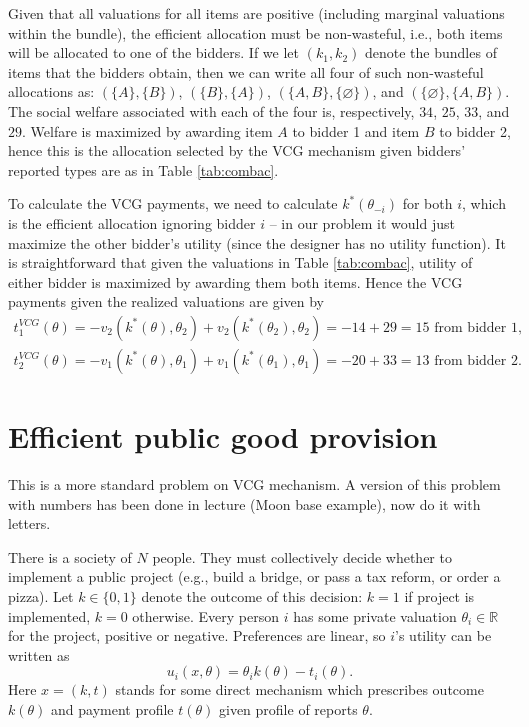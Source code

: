 \documentclass[a4paper]{article}
\begin{document}
	Given that all valuations for all items are positive (including marginal valuations within the bundle), the efficient allocation must be non-wasteful, i.e., both items will be allocated to one of the bidders. If we let $(k_1,k_2)$ denote the bundles of items that the bidders obtain, then we can write all four of such non-wasteful allocations as: $(\{A\},\{B\})$, $(\{B\},\{A\})$, $(\{A,B\},\{\varnothing\})$, and $(\{\varnothing\},\{A,B\})$. The social welfare associated with each of the four is, respectively, $34$, $25$, $33$, and $29$. Welfare is maximized by awarding item $A$ to bidder 1 and item $B$ to bidder 2, hence this is the allocation selected by the VCG mechanism given bidders' reported types are as in Table \ref{tab:combac}.
	
	To calculate the VCG payments, we need to calculate $k^*(\theta_{-i})$ for both $i$, which is the efficient allocation ignoring bidder $i$ -- in our problem it would just maximize the other bidder's utility (since the designer has no utility function). It is straightforward that given the valuations in Table \ref{tab:combac}, utility of either bidder is maximized by awarding them both items. Hence the VCG payments given the realized valuations are given by
	\begin{align*}
		t_1^{VCG}(\theta) = -v_2(k^*(\theta),\theta_2) + v_2(k^*(\theta_2),\theta_2) = -14+29 = 15 \text{ from bidder 1,}
		\\
		t_2^{VCG}(\theta) = -v_1(k^*(\theta),\theta_1) + v_1(k^*(\theta_1),\theta_1) = -20+33 = 13 \text{ from bidder 2.}
	\end{align*}
\fi 



\section{Efficient public good provision}
	
	This is a more standard problem on VCG mechanism. A version of this problem with numbers has been done in lecture (Moon base example), now do it with letters.
	
	There is a society of $N$ people. They must collectively decide whether to implement a public project (e.g., build a bridge, or pass a tax reform, or order a pizza). Let $k \in \{0,1\}$ denote the outcome of this decision: $k=1$ if project is implemented, $k=0$ otherwise. Every person $i$ has some private valuation $\theta_i \in \mathbb{R}$ for the project, positive or negative. Preferences are linear, so $i$'s utility can be written as
	$$
		u_i(x,\theta) = \theta_i k(\theta) - t_i(\theta).
	$$
	Here $x=(k,t)$ stands for some direct mechanism which prescribes outcome $k(\theta)$ and payment profile $t(\theta)$ given profile of reports $\theta$.
	
\end{document}
